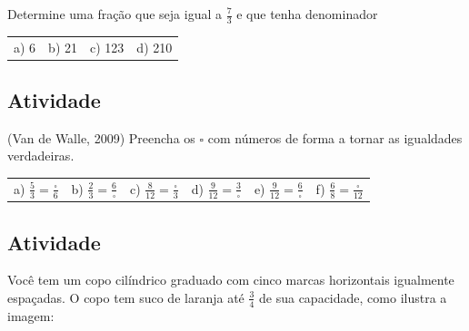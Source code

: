 Determine uma fração que seja igual a $\frac{7}{3}$ e que tenha denominador

\begin{tabular}{m{}m{}m{}m{}}
 a) 6 & b) 21 & c) 123 & d) 210
\end{tabular}

\subsection{Atividade}

(Van de Walle, 2009)
Preencha os $\square$ com números de forma a tornar as igualdades verdadeiras.

\noindent\begin{tabular}{m{}m{}m{}m{}m{}m{}}
a)  $\frac{5}{3} = \frac{\square}{6}$ & b) $\frac{2}{3} = \frac{6}{\square}$ & c) $\frac{8}{12} = \frac{\square}{3}$ & d) $\frac{9}{12} = \frac{3}{\square}$& e) $\frac{9}{12} = \frac{6}{\square}$& f)  $\frac{6}{8} = \frac{\square}{12}$
\end{tabular}

\subsection{Atividade}

Você tem um copo cilíndrico graduado com cinco marcas horizontais igualmente espaçadas. O copo tem suco de laranja até $\frac{3}{4}$ de sua capacidade, como ilustra a imagem:

\begin{center}

\end{center}

